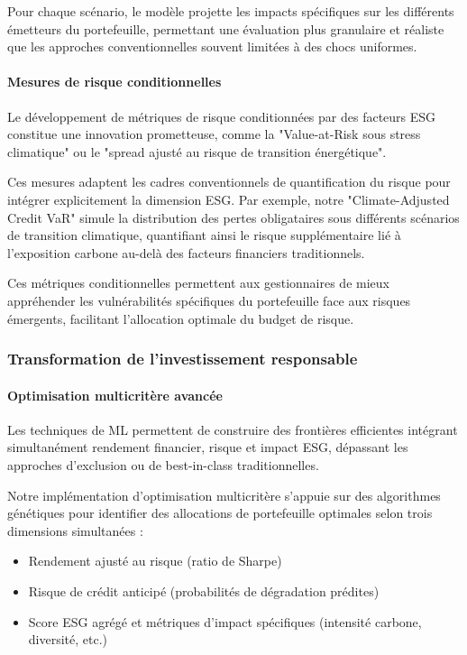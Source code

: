 Pour chaque scénario, le modèle projette les impacts spécifiques sur les différents émetteurs du portefeuille, permettant une évaluation plus granulaire et réaliste que les approches conventionnelles souvent limitées à des chocs uniformes.

\paragraph{Mesures de risque conditionnelles}

Le développement de métriques de risque conditionnées par des facteurs ESG constitue une innovation prometteuse, comme la "Value-at-Risk sous stress climatique" ou le "spread ajusté au risque de transition énergétique".

Ces mesures adaptent les cadres conventionnels de quantification du risque pour intégrer explicitement la dimension ESG. Par exemple, notre "Climate-Adjusted Credit VaR" simule la distribution des pertes obligataires sous différents scénarios de transition climatique, quantifiant ainsi le risque supplémentaire lié à l'exposition carbone au-delà des facteurs financiers traditionnels.

Ces métriques conditionnelles permettent aux gestionnaires de mieux appréhender les vulnérabilités spécifiques du portefeuille face aux risques émergents, facilitant l'allocation optimale du budget de risque.

\subsubsection{Transformation de l'investissement responsable}

\paragraph{Optimisation multicritère avancée}

Les techniques de ML permettent de construire des frontières efficientes intégrant simultanément rendement financier, risque et impact ESG, dépassant les approches d'exclusion ou de best-in-class traditionnelles.

Notre implémentation d'optimisation multicritère s'appuie sur des algorithmes génétiques pour identifier des allocations de portefeuille optimales selon trois dimensions simultanées :
\begin{itemize}
    \item Rendement ajusté au risque (ratio de Sharpe)
    \item Risque de crédit anticipé (probabilités de dégradation prédites)
    \item Score ESG agrégé et métriques d'impact spécifiques (intensité carbone, diversité, etc.)
\end{itemize}

